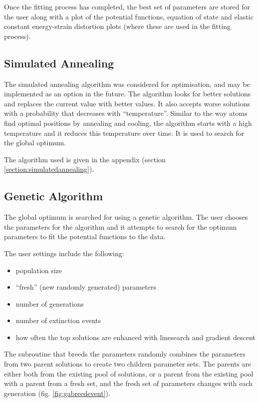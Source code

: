 Once the fitting process has completed, the best set of parameters are stored for the user along with a plot of the potential functions, equation of state and elastic constant energy-strain distortion plots (where these are used in the fitting process).





\subsection{Simulated Annealing}

The simulated annealing algorithm was considered for optimisation, and may be implemented as an option in the future.  The algorithm looks for better solutions and replaces the current value with better values.  It also accepts worse solutions with a probability that decreases with \enquote{temperature}.  Similar to the way atoms find optimal positions by annealing and cooling, the algorithm starts with a high temperature and it reduces this temperature over time.  It is used to search for the global optimum.

The algorithm used is given in the appendix (section \ref{section:simulatedannealing}).




\subsection{Genetic Algorithm}

The global optimum is searched for using a genetic algorithm.  The user chooses the parameters for the algorithm and it attempts to search for the optimum parameters to fit the potential functions to the data.

The user settings include the following:

\begin{itemize}
\item population size
\item \enquote{fresh} (new randomly generated) parameters
\item number of generations
\item number of extinction events
\item how often the top solutions are enhanced with linesearch and gradient descent
\end{itemize}

The subroutine that breeds the parameters randomly combines the parameters from two parent solutions to create two children parameter sets.  The parents are either both from the existing pool of solutions, or a parent from the existing pool with a parent from a fresh set, and the fresh set of parameters changes with each generation (fig. \ref{fig:gabreedevent}).

